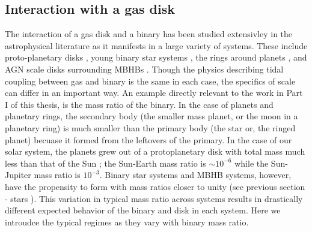 	


\subsection{Interaction with a gas disk}   The interaction of a gas disk and a
binary has been studied extensivley in the astrophysical literature as it
manifests in a large variety of systems. These include proto-planetary disks
\citep{}, young binary star systems \citep{}, the rings around planets
\citep{GTSaturn}, and AGN scale disks surrounding MBHBs \citep{}. Though the
physics describing tidal coupling between gas and binary is the same in each
case, the specifics of scale can differ in an important way.  An example
directly relevant to the work in Part I of this thesis, is the mass ratio of
the binary. In the case of planets and planetary rings, the secondary body
(the smaller mass planet, or the moon in a planetary ring) is much smaller
than the primary body (the star or, the ringed planet) becuase it formed from
the leftovers of the primary. In the case of our solar system, the planets
grew out of a protoplanetary disk with total mass much less than that of the
Sun \citep{}; the Sun-Earth mass ratio is $\sim10^{-6}$ while the Sun-Jupiter
mass ratio is $10^{-3}$. Binary star systems and MBHB systems, however, have
the propensity to form with mass ratios closer to unity (see previous section
- stars \citep{}). This variation in typical mass ratio across systems results
in drastically different expected behavior of the binary and disk in each
system. Here we introudce the typical regimes as they vary with binary mass
ratio.




